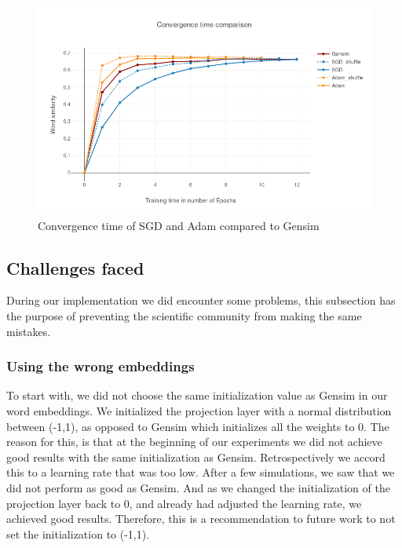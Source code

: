 \begin{figure}[h]
\centering
\includegraphics[scale=0.45]{images/gensim_vs_adam}
\caption{Convergence time of SGD and Adam compared to Gensim}
\label{fig:gensim_vs_adam}
\end{figure}\subsection{Challenges faced}
During our implementation we did encounter some problems, this subsection has the purpose of preventing the scientific community from making the same mistakes.
\subsubsection{Using the wrong embeddings}
To start with, we did not choose the same initialization value as Gensim in our word embeddings. We initialized the projection layer with a normal distribution between (-1,1), as opposed to Gensim which initializes all the weights to 0. The reason for this, is that at the beginning of our experiments we did not achieve good results with the same initialization as Gensim. Retrospectively we accord this to a learning rate that was too low. After a few simulations, we saw that we did not perform as good as Gensim. And as we changed the initialization of the projection layer back to 0, and already had adjusted the learning rate, we achieved good results. Therefore, this is a recommendation to future work to not set the initialization to (-1,1).

